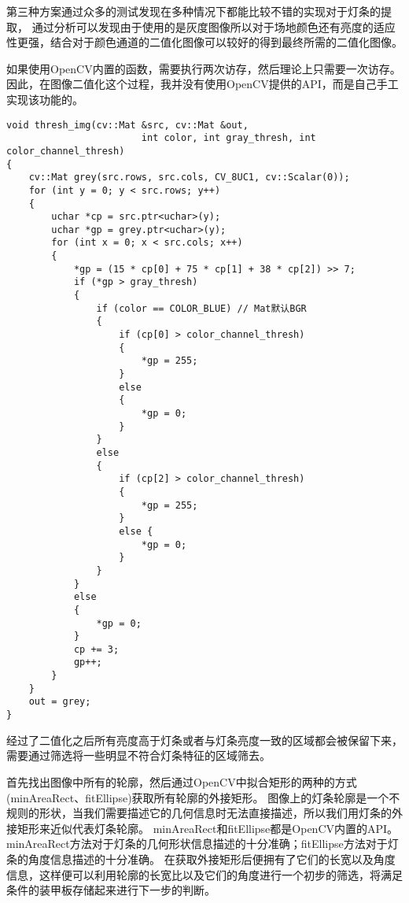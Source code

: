 第三种方案通过众多的测试发现在多种情况下都能比较不错的实现对于灯条的提取，
通过分析可以发现由于使用的是灰度图像所以对于场地颜色还有亮度的适应性更强，结合对于颜色通道的二值化图像可以较好的得到最终所需的二值化图像。\par

如果使用OpenCV内置的函数，需要执行两次访存，然后理论上只需要一次访存。因此，在图像二值化这个过程，我并没有使用OpenCV提供的API，而是自己手工实现该功能的。
\begin{lstlisting}
void thresh_img(cv::Mat &src, cv::Mat &out, 
                        int color, int gray_thresh, int color_channel_thresh)
{
    cv::Mat grey(src.rows, src.cols, CV_8UC1, cv::Scalar(0));
    for (int y = 0; y < src.rows; y++)
    {
        uchar *cp = src.ptr<uchar>(y);
        uchar *gp = grey.ptr<uchar>(y);
        for (int x = 0; x < src.cols; x++)
        {
            *gp = (15 * cp[0] + 75 * cp[1] + 38 * cp[2]) >> 7;
            if (*gp > gray_thresh) 
            {
                if (color == COLOR_BLUE) // Mat默认BGR
                {
                    if (cp[0] > color_channel_thresh)
                    {
                        *gp = 255;
                    }
                    else 
                    {
                        *gp = 0;
                    }
                } 
                else 
                {
                    if (cp[2] > color_channel_thresh)
                    {
                        *gp = 255;
                    }
                    else {
                        *gp = 0;
                    }
                } 
            }
            else
            {
                *gp = 0;
            }
            cp += 3;
            gp++;
        } 
    }
    out = grey;
}
\end{lstlisting}


经过了二值化之后所有亮度高于灯条或者与灯条亮度一致的区域都会被保留下来，需要通过筛选将一些明显不符合灯条特征的区域筛去。\par

首先找出图像中所有的轮廓，然后通过OpenCV中拟合矩形的两种的方式(minAreaRect、fitEllipse)获取所有轮廓的外接矩形。
图像上的灯条轮廓是一个不规则的形状，当我们需要描述它的几何信息时无法直接描述，所以我们用灯条的外接矩形来近似代表灯条轮廓。
minAreaRect和fitEllipse都是OpenCV内置的API。minAreaRect方法对于灯条的几何形状信息描述的十分准确；fitEllipse方法对于灯条的角度信息描述的十分准确。
在获取外接矩形后便拥有了它们的长宽以及角度信息，这样便可以利用轮廓的长宽比以及它们的角度进行一个初步的筛选，将满足条件的装甲板存储起来进行下一步的判断。\par


